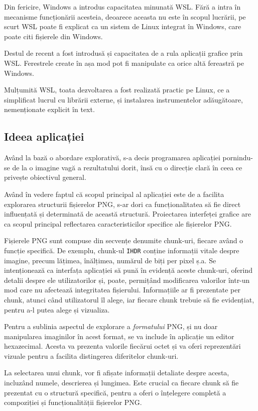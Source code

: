 \documentclass[a4paper,12pt]{report}
\begin{document}
Din fericire, Windows a introdus capacitatea minunată \ac{WSL}.
Fără a intra în mecanisme funcționării acesteia, deoarece aceasta nu este în scopul lucrării,
pe scurt \ac{WSL} poate fi explicat ca un sistem de Linux integrat în Windows, care poate citi fișierele din Windows.

Destul de recent a fost introdusă și capacitatea de a rula aplicații grafice prin \ac{WSL}.
Ferestrele create în așa mod pot fi manipulate ca orice altă fereastră pe Windows.

Mulțumită \ac{WSL}, toata dezvoltarea a fost realizată practic pe Linux, 
ce a simplificat lucrul cu librării externe, și instalarea instrumentelor adăugătoare, nemenționate explicit în text.

\subsection{Ideea aplicației}

Având la bază o abordare explorativă, s-a decis programarea aplicației
pornindu-se de la o imagine vagă a rezultatului dorit,
însă cu o direcție clară în ceea ce privește obiectivul general.

Având în vedere faptul că scopul principal al aplicației
este de a facilita explorarea structurii fișierelor \ac{PNG},
s-ar dori ca funcționalitatea să fie direct
influențată și determinată de această structură.
Proiectarea interfeței grafice are ca scopul principal reflectarea
caracteristicilor specifice ale fișierelor \ac{PNG}.

Fișierele \ac{PNG} sunt compuse din secvențe denumite chunk-uri,
fiecare având o funcție specifică.
De exemplu, chunk-ul \texttt{IHDR} conține informații vitale despre imagine,
precum lățimea, înălțimea, numărul de biți per pixel ș.a.
Se intenționează ca interfața aplicației să pună
în evidență aceste chunk-uri, oferind detalii despre ele utilizatorilor
și, poate, permițând modificarea valorilor într-un mod
care nu afectează integritatea fișierului.
Informațiile ar fi prezentate per chunk, atunci când utilizatorul îl alege,
iar fiecare chunk trebuie să fie evidențiat, pentru a-l putea alege și vizualiza.

Pentru a sublinia aspectul de explorare a \textit{formatului} \ac{PNG},
și nu doar manipularea imaginilor în acest format,
se va include în aplicație un editor hexazecimal.
Acesta va prezenta valorile fiecărui octet și
va oferi reprezentări vizuale pentru a facilita distingerea diferitelor chunk-uri.

La selectarea unui chunk, vor fi afișate informații detaliate despre acesta,
incluzând numele, descrierea și lungimea.
Este crucial ca fiecare chunk să fie prezentat cu o structură specifică,
pentru a oferi o înțelegere completă a compoziției și funcționalității fișierelor \ac{PNG}.
\end{document}
